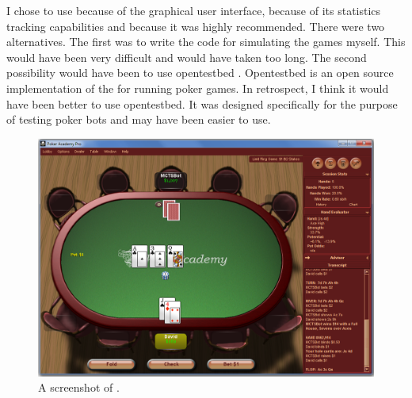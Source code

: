 I chose to use \pa because of the graphical user interface, because of its statistics tracking capabilities and because it was highly recommended. There were two alternatives. The first was to write the code for simulating the games myself. This would have been very difficult and would have taken too long.
The second possibility would have been to use opentestbed \cite{opentestbed}. Opentestbed is an open source implementation of the \meer for running poker games. In retrospect, I think it would have been better to use opentestbed. It was designed specifically for the purpose of testing poker bots and may have been easier to use. 

\begin{figure}[h!]
\centering
\includegraphics[width=144mm]{Screenshots/PAP1.png}
\caption{A screenshot of \pap.}
\end{figure}




\section{\sbt}									%


